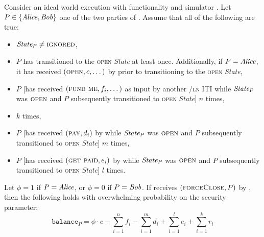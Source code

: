 \begin{lemma}
\label{lemma:ideal-balance}
  Consider an ideal world execution with functionality \fchan and simulator
  \simulator. Let $P \in \{\mathit{Alice}, \mathit{Bob}\}$ one of the two parties of \fchan.
  Assume that all of the following are true:
  \begin{itemize}
    \item $\itistate_P \neq \textsc{ignored}$,
    \item $P$ has transitioned to the \textsc{open} \textit{State} at least
    once. Additionally, if $P = \mathit{Alice}$, it has received $(\textsc{open}, c,
    \dots)$ by \environment prior to transitioning to the \textsc{open}
    \textit{State},
    \item $P$ [has received $(\textsc{fund me}, f_i, \dots)$ as input by another
    \fchan/\textsc{ln} ITI while $\itistate_P$ was $\textsc{open}$ and $P$
    subsequently transitioned to \textsc{open} \textit{State}] $n$ times,
    \item {} $k$ times,
    \item $P$ [has received $(\textsc{pay}, d_i)$ by \environment while
    $\itistate_P$ was $\textsc{open}$ and $P$ subsequently transitioned to
    \textsc{open} \textit{State}] $m$ times,
    \item $P$ [has received $(\textsc{get paid}, e_i)$ by \environment while
    $\itistate_P$ was $\textsc{open}$ and $P$ subsequently transitioned to
    \textsc{open} \textit{State}] $l$ times.
  \end{itemize}
  Let $\phi = 1$ if $P = \mathit{Alice}$, or $\phi = 0$ if $P = \mathit{Bob}$. If \fchan
  receives $(\textsc{forceClose}, P)$ by \simulator, then the following holds with
  overwhelming probability on the security parameter:
  \begin{equation}
    \texttt{balance}_P = \phi \cdot c - \sum\limits_{i=1}^n f_i -
    \sum\limits_{i=1}^m d_i + \sum\limits_{i=1}^l e_i + \sum\limits_{i=1}^k r_i
  \end{equation}
\end{lemma}

